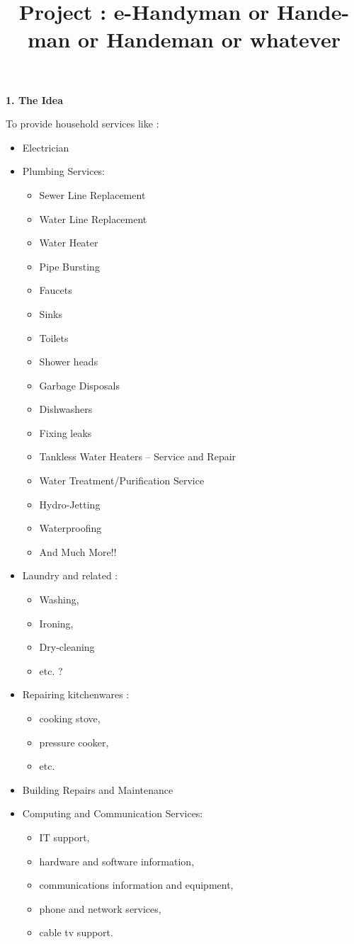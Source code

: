 \documentclass[10pt,a4paper]{article}
\title{Project : e-Handyman or Hande-man or Handeman or whatever}
\date{\vspace{-5ex}}
\begin{document}
\maketitle



\textbf{1. The Idea}

To provide household services like : 
\begin{itemize}
	\item Electrician
	\item Plumbing Services: 
	\begin{itemize}
	    \item Sewer Line Replacement
	    \item Water Line Replacement
	    \item Water Heater
	    \item Pipe Bursting
	    \item Faucets
	    \item Sinks
	    \item Toilets
	    \item Shower heads
	    \item Garbage Disposals
	    \item Dishwashers
	    \item Fixing leaks
	    \item Tankless Water Heaters – Service and Repair
	    \item Water Treatment/Purification Service
	    \item Hydro-Jetting
	    \item Waterproofing
            \item And Much More!!
	\end{itemize}
	\item Laundry and related : 
	\begin{itemize}
	    \item Washing, 
	    \item Ironing, 
	    \item Dry-cleaning
	    \item etc. ?
	\end{itemize}
	\item Repairing kitchenwares : 
	\begin{itemize}
	    \item cooking stove, 
	    \item pressure cooker, 
	    \item etc.
	\end{itemize}
	\item Building Repairs and Maintenance
	\item Computing and Communication Services: 
	\begin{itemize}
	    \item IT support, 
	    \item hardware and software information, 
	    \item communications information and equipment, 
	    \item phone and network services, 
	    \item cable tv support.
	\end{itemize}
\end{itemize}
\end{document}
